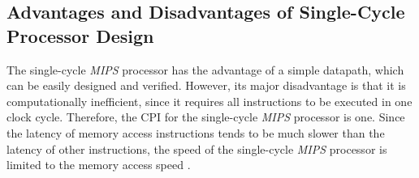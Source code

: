 \subsection{Advantages and Disadvantages of Single-Cycle Processor Design}
\label{ssec:AdvantagesandDisadvantagesofSingleCycleProcessorDesign}

The single-cycle {\it MIPS} processor has the advantage of a simple datapath, which can be easily designed and verified. However, its major disadvantage is that it is computationally inefficient, since it requires all instructions to be executed in one clock cycle. Therefore, the CPI for the single-cycle {\it MIPS} processor is one. Since the latency of memory access instructions tends to be much slower than the latency of other instructions, the speed of the single-cycle {\it MIPS} processor is limited to the memory access speed \cite{Patterson2005,Patterson2009}.














































